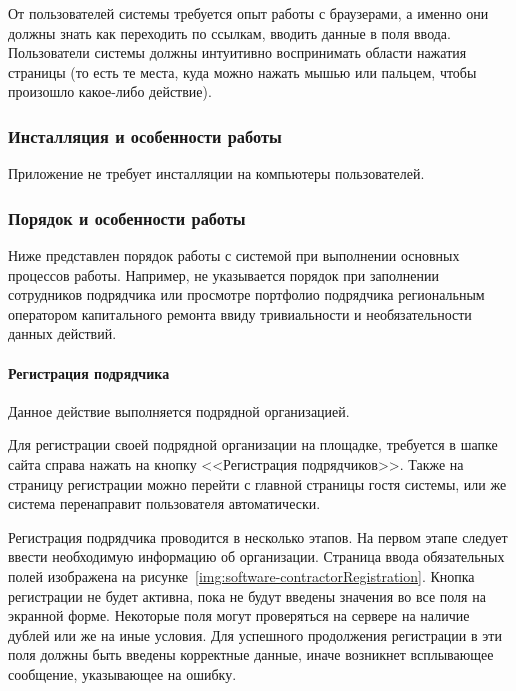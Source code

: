 От пользователей системы требуется опыт работы с браузерами, а именно они должны знать как переходить по ссылкам, вводить данные в поля ввода.
Пользователи системы должны интуитивно воспринимать области нажатия страницы (то есть те места, куда можно нажать мышью или пальцем, чтобы произошло какое-либо действие).

\subsubsection{Инсталляция и особенности работы}

Приложение не требует инсталляции на компьютеры пользователей.

\subsubsection{Порядок и особенности работы}

Ниже представлен порядок работы с системой при выполнении основных процессов работы.
Например, не указывается порядок при заполнении сотрудников подрядчика или просмотре портфолио подрядчика региональным оператором капитального ремонта ввиду тривиальности и необязательности данных действий.

\paragraph{Регистрация подрядчика}

Данное действие выполняется подрядной организацией.

Для регистрации своей подрядной организации на площадке, требуется в шапке сайта справа нажать на кнопку <<Регистрация подрядчиков>>.
Также на страницу регистрации можно перейти с главной страницы гостя системы, или же система перенаправит пользователя автоматически.

Регистрация подрядчика проводится в несколько этапов.
На первом этапе следует ввести необходимую информацию об организации.
Страница ввода обязательных полей изображена на рисунке~\ref{img:software-contractorRegistration}.
Кнопка регистрации не будет активна, пока не будут введены значения во все поля на экранной форме.
Некоторые поля могут проверяться на сервере на наличие дублей или же на иные условия.
Для успешного продолжения регистрации в эти поля должны быть введены корректные данные, иначе возникнет всплывающее сообщение, указывающее на ошибку.

